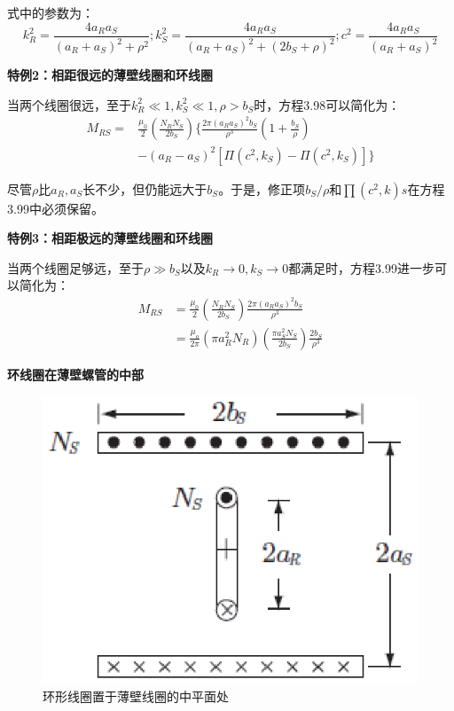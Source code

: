 式中的参数为：
\begin{equation*}
k_R^2=\frac{4a_Ra_S}{(a_R+a_S)^2+\rho^2};k_S^2=\frac{4a_Ra_S}{(a_R+a_S)^2+(2b_S+\rho)^2};c^2=\frac{4a_Ra_S}{(a_R+a_S)^2}%
\end{equation*}

\textbf{特例2：相距很远的薄壁线圈和环线圈} 

  当两个线圈很远，至于$k_R^2 \ll 1, k_S^2\ll 1,\rho > b_S$时，方程3.98可以简化为：
  \begin{equation}
  \begin{split}
M_{RS}=&\frac{\mu_0}{2}(\frac{N_RN_S}{2b_S})\{\frac{2\pi(a_Ra_S)^2b_S}{\rho^3}(1+\frac{b_S}{\rho})\\
&-(a_R-a_S)^2[\Pi(c^2,k_S)-\Pi(c^2,k_S)]\}%
  \end{split}
  \end{equation}
  
尽管$\rho$比$a_R,a_S$长不少，但仍能远大于$b_S$。于是，修正项$b_S/\rho$和$\prod(c^2, k)s$在方程3.99中必须保留。

\textbf{特例3：相距极远的薄壁线圈和环线圈} 

  当两个线圈足够远，至于$\rho \gg b_S$以及$k_R\rightarrow 0,k_S\rightarrow 0$都满足时，方程3.99进一步可以简化为：
 \begin{equation}
\begin{split}
M_{RS}&=\frac{\mu_0}{2}(\frac{N_RN_S}{2b_S})\frac{2\pi(a_Ra_S)^2b_S}{\rho^3}\\
&=\frac{\mu_o}{2\pi}(\pi a_R^2N_R)(\frac{\pi a_S^2N_S}{2b_S})\frac{2b_S}{\rho^3}%
\end{split}
\end{equation}

\textbf{环线圈在薄壁螺管的中部} 
\begin{figure}[htbp]
	\centering
	\includegraphics[scale=0.7]{chpt3/figs/fig3.15.eps}
	\caption{环形线圈置于薄壁线圈的中平面处}
\end{figure}

